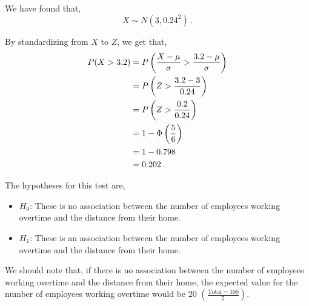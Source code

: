 \begin{subquestions}
\begin{subsubquestions}

\subsubquestion

We have found that,
\begin{equation}
	X \sim N(3,0.24^2) \,.
\end{equation}

By standardizing from $X$ to $Z$, we get that,
\begin{align}
	P(X>3.2) & = P\left(\frac{X-\mu}{\sigma}>\frac{3.2-\mu}{\sigma} \right) \nonumber \\
	         & = P\left(Z>\frac{3.2-3}{0.24} \right) \nonumber \\
	         & = P\left(Z>\frac{0.2}{0.24} \right) \nonumber \\
	         & = 1 - \Phi\left(\frac{5}{6}\right) \nonumber \\
	         & = 1 - 0.798 \nonumber \\
	         & = 0.202 \,.
\end{align}

\end{subsubquestions}


\subquestion

\begin{subsubquestions}
	
\subsubquestion

The hypotheses for this test are,
\begin{itemize}
	\item $H_0$: These is no association between the number of employees working overtime and the distance from their home.
	\item $H_1$: These is an association between the number of employees working overtime and the distance from their home.
\end{itemize}
	

\subsubquestion

We should note that, if there is no association between the number of employees working overtime and the distance from their home, the expected value for the number of employees working overtime would be 20 $(\frac{\text{Total}=100}{5})$. 



\end{subsubquestions}
\end{subquestions}

